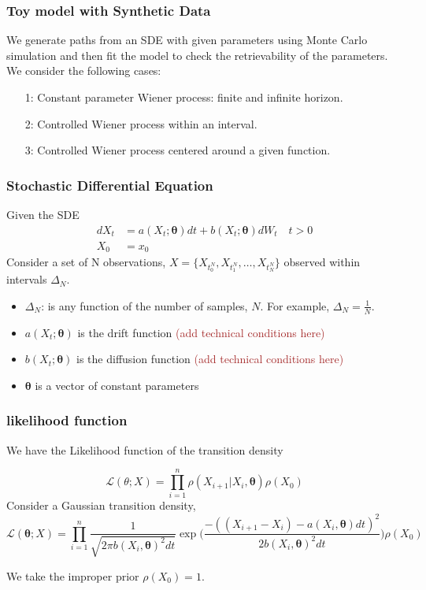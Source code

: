 \documentclass[aspectratio=169]{beamer}\usepackage[utf8]{inputenc}
\begin{document}
\begin{frame}\frametitle{ Toy model with Synthetic Data }
We generate paths from an SDE  with given parameters using Monte Carlo simulation and then fit the model to check the retrievability of the parameters. We consider the following cases:
\begin{itemize}
\item[1:]  Constant parameter Wiener process: finite and infinite horizon.
\item[2:]  Controlled Wiener process within an interval.
\item[3:]  Controlled Wiener process centered around a given function. 
\end{itemize}
\end{frame}


\begin{frame}\frametitle{ Stochastic Differential Equation }
Given the SDE
\begin{equation}
\begin{split}
dX_t &= a(X_t; \bm{\theta}) dt + b (X_t; \bm{\theta} ) dW_t \quad t > 0 \\
X_0 & = x_0
\end{split}\label{main}
\end{equation}
Consider a set of N observations, $ X=\{ X_{t_0^N} , X_{t_1^N} ,\ldots , X_{t_N^N} \}$ observed within intervals $\Delta_N$. 

\begin{itemize}
\item $\Delta_N$: is any function of the number of samples, $N$. For example, $\Delta_N = \frac{1}{N}$.
\item $a(X_t; \bm{\theta})$ is the drift function \textcolor{brown}{(add technical conditions here)}
\item $b (X_t; \bm{\theta} )$ is the diffusion function \textcolor{brown}{(add technical conditions here)}
\item $\bm{\theta}$ is a vector of constant parameters
\end{itemize}
\end{frame}

\begin{frame}\frametitle{ likelihood function }
We have the Likelihood function of the transition density

\begin{equation}
\mathcal{L}(\theta;X) = \prod\limits_{i=1}^n\rho( {X_{i+1}|X_{i}}, \bm{\theta})  \rho(X_0) 
\end{equation}
Consider a Gaussian transition density,
\begin{equation*}
\mathcal{L}(\bm{\theta}; X) = \prod\limits_{i=1}^n  \frac{1}{\sqrt{2 \pi b(X_i,\bm{\theta})^2 dt}  } \exp\Big(\frac{-((X_{i+1}-X_i) - a(X_i,\bm{\theta}) dt )^2}{2b(X_i,\bm{\theta})^2 dt}\Big) \rho(X_0)
\end{equation*}

We take the improper prior $\rho(X_0)=1$.
\end{frame}
\end{document}
